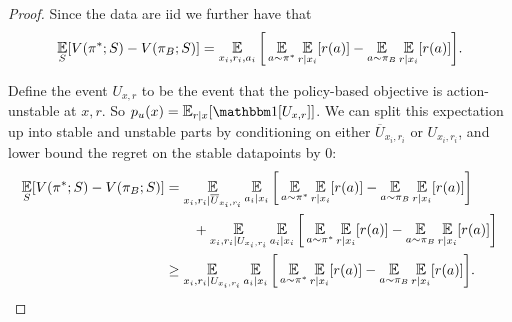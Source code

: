 \begin{subappendices}
\begin{proof}
Since the data are iid we further have that
\begin{align*}
    \E_{S}[V(\pi^*;S) - V(\pi_B;S)] = \E_{x_i, r_i, a_i}\bigg[ \E_{a\sim \pi^*}\E_{r|x_i}[r(a)] -  \E_{a\sim \pi_B}\E_{r|x_i}[r(a)]\bigg].
\end{align*}

Define the event $ U_{x,r}$ to be the event that the policy-based objective is action-unstable at $ x,r$. So $ p_u(x) = \E_{r|x}[\one[U_{x,r}]]$.
We can split this expectation up into stable and unstable parts by conditioning on either $ \overline U_{x_i, r_i}$ or $ U_{x_i, r_i}$, and lower bound the regret on the stable datapoints by 0:
\begin{align*}
    \E_{S}[V(\pi^*;S) - V(\pi_B;S)] &= \E_{x_i, r_i |\overline U_{x_i, r_i}} \E_{a_i|x_i}\bigg[ \E_{a\sim \pi^*}\E_{r|x_i}[r(a)] -  \E_{a\sim \pi_B}\E_{r|x_i}[r(a)]\bigg] \\
    &\qquad + \E_{x_i, r_i |U_{x_i, r_i}} \E_{ a_i|x_i}\bigg[ \E_{a\sim \pi^*}\E_{r|x_i}[r(a)] -  \E_{a\sim \pi_B}\E_{r|x_i}[r(a)]\bigg]\\
    &\geq \E_{x_i, r_i |U_{x_i, r_i}} \E_{ a_i|x_i}\bigg[ \E_{a\sim \pi^*}\E_{r|x_i}[r(a)] -  \E_{a\sim \pi_B}\E_{r|x_i}[r(a)]\bigg].
\end{align*}


\end{proof}
\end{subappendices}
